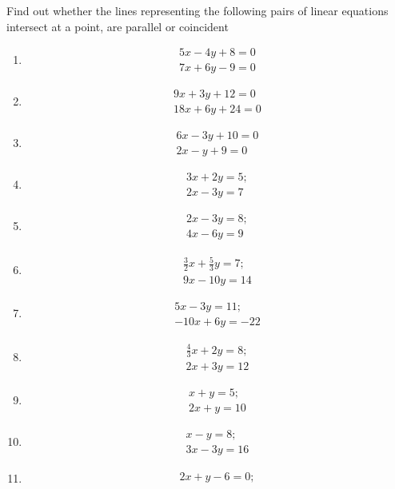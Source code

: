 Find out whether the lines representing the following pairs of linear equations intersect at a point, are parallel or coincident
\begin{enumerate}[label=\thesubsection.\arabic*,ref=\thesubsection.\theenumi]
\item \begin{align}
	5x-4y+8=0\\ 
      	7x+6y-9=0
	\end{align}
\item \begin{align}
	9x+3y+12=0\\
	18x+6y+24=0
	\end{align}
\item \begin{align}
        6x-3y+10=0\\
	2x-y+9=0
	\end{align}
	\item \begin{align}
       		3x+2y=5; \\
      		2x-3y=7
    	       \end{align} 
	\item \begin{align}
		2x-3y=8;\\
		4x-6y=9
		\end{align}
	\item \begin{align}
		\frac{3}{2}x+\frac{5}{3}y=7;\\
		9x-10y=14
		\end{align}
\item \begin{align}
		5x-3y=11;\\
		-10x+6y=-22
	\end{align}
\item \begin{align}
         \frac{4}{3}x+2y=8;\\
	  2x+3y=12
	\end{align}
\item \begin{align}
	x+y=5;\\
	2x+y=10
	\end{align}
\item \begin{align}
	x-y=8;\\
	3x-3y=16
	\end{align}
\item \begin{align}
 	2x+y-6=0;\\

\end{align}
\end{enumerate}
